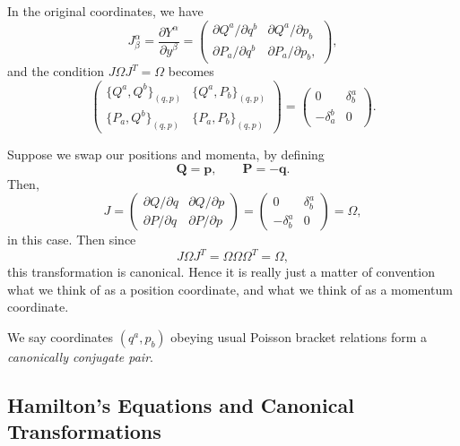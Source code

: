 \documentclass[12pt]{article}
\begin{document}
In the original coordinates, we have
\[
J^{\alpha}_\beta = \frac{\partial Y^{\alpha}}{\partial y^{\beta}} =
\begin{pmatrix}
	\partial Q^{a}/\partial q^b & \partial Q^a/\partial p_b \\
	\partial P_a/\partial q^b & \partial P_a/\partial p_b,
\end{pmatrix},
\]
and the condition $J \Omega J^{T} = \Omega$ becomes
\[
\begin{pmatrix}
	\{Q^a, Q^b\}_{(q, p)} & \{Q^a, P_b\}_{(q, p)} \\
	\{P_a, Q^b\}_{(q, p)} & \{P_a, P_b\}_{(q, p)}
\end{pmatrix}
=
\begin{pmatrix}
	0 & \delta^{a}_b \\
	-\delta_a^b & 0
\end{pmatrix}.
\]

\begin{exbox}
	Suppose we swap our positions and momenta, by defining
	\[
	\mathbf{Q} = \mathbf{p}, \qquad \mathbf{P} = - \mathbf{q}.
	\]
	Then,
	\[
	J =
	\begin{pmatrix}
		\partial Q/\partial q & \partial Q/\partial p \\
		\partial P/\partial q & \partial P/\partial p
	\end{pmatrix}
	=
	\begin{pmatrix}
		0 & \delta^a_b \\
		-\delta^a_b & 0
	\end{pmatrix} = \Omega,
	\]
	in this case. Then since
	\[
	J \Omega J^{T} = \Omega \Omega \Omega^{T} = \Omega,
	\]
	this transformation is canonical. Hence it is really just a matter of convention what we think of as a position coordinate, and what we think of as a momentum coordinate.
\end{exbox}

We say coordinates $(q^a, p_b)$ obeying usual Poisson bracket relations form a \emph{canonically conjugate pair}.

\subsection{Hamilton's Equations and Canonical Transformations}
\label{sub:ham_eq_can_trans}
\end{document}
